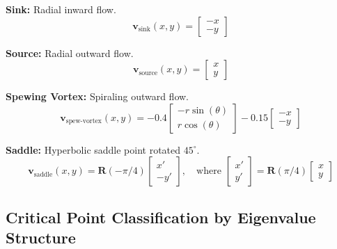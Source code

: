 \documentclass[lettersize,journal]{IEEEtran}
\begin{document}
\textbf{Sink:} Radial inward flow.
\begin{equation}
\mathbf{v}_{\text{sink}}(x, y) = \begin{bmatrix} -x \\ -y \end{bmatrix}
\end{equation}

\textbf{Source:} Radial outward flow.
\begin{equation}
\mathbf{v}_{\text{source}}(x, y) = \begin{bmatrix} x \\ y \end{bmatrix}
\end{equation}

\textbf{Spewing Vortex:} Spiraling outward flow.
\begin{equation}
\mathbf{v}_{\text{spew-vortex}}(x, y) = -0.4 \begin{bmatrix} -r \sin(\theta) \\ r \cos(\theta) \end{bmatrix} - 0.15 \begin{bmatrix} -x \\ -y \end{bmatrix}
\end{equation}

\textbf{Saddle:} Hyperbolic saddle point rotated $45^\circ$.
\begin{equation}
\mathbf{v}_{\text{saddle}}(x, y) = \mathbf{R}(-\pi/4) \begin{bmatrix} x' \\ -y' \end{bmatrix}, \quad \text{where } \begin{bmatrix} x' \\ y' \end{bmatrix} = \mathbf{R}(\pi/4) \begin{bmatrix} x \\ y \end{bmatrix}
\end{equation}

\subsection{Critical Point Classification by Eigenvalue Structure}
\end{document}
